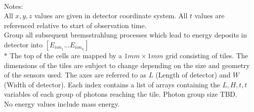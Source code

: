 \documentclass{article}
\begin{document}
\noindent
\\
Notes:\\
All $x,y,z$ values are given in detector coordinate system. All $t$ values are referenced relative to start of observation time. \\
Group all subsequent bremsstrahlung processes which lead to energy deposits in detector into $[E_{ion_1}...E_{ion_n}]$\\
$*$ The top of the cells are  mapped by a $1mm \times 1mm$ grid consisting of tiles. The dimensions of the tiles are subject to change depending on the size and geometry of the sensors used. The axes are referred to as $L$ (Length of detector) and $W$ (Width of detector). Each index contains a list of arrays containing the $L,H,t, t$ variables of each group of photons reaching the tile. Photon group size TBD.\\
No energy values include mass energy.
\end{document}

